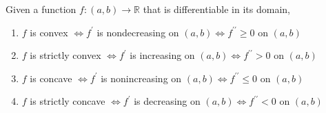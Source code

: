   \begin{theorem}
    Given a function $f: (a, b) \longrightarrow \mathbb{R}$ that is differentiable in its domain, 
    \begin{enumerate}
      \item $f$ is convex $\iff f^\prime$ is nondecreasing on $(a, b) \iff f^{\prime\prime} \geq 0$ on $(a, b)$ 
      \item $f$ is strictly convex $\iff f^\prime$ is increasing on $(a, b) \iff f^{\prime\prime} > 0$ on $(a, b)$ 
      \item $f$ is concave $\iff f^\prime$ is nonincreasing on $(a, b) \iff f^{\prime\prime} \leq 0$ on $(a, b)$ 
      \item $f$ is strictly concave $\iff f^\prime$ is decreasing on $(a, b) \iff f^{\prime\prime} < 0$ on $(a, b)$ 
    \end{enumerate}
  \end{theorem}

